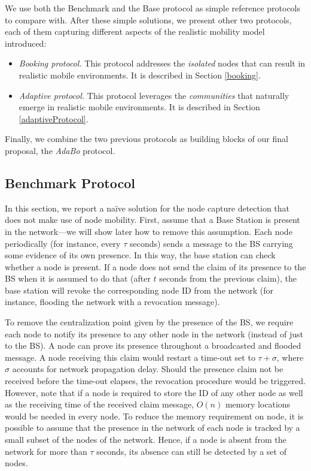 \documentclass{IEEEconf}
\begin{document}
We use both the Benchmark and the Base protocol as simple reference protocols to compare with.
After these simple solutions, we present other two protocols, each of them capturing different aspects of the realistic mobility model introduced:
\begin{itemize}
\item \textit{Booking protocol.} This protocol addresses the \textit{isolated} nodes that can result in
realistic mobile environments. It is described in Section \ref{booking}.
\item \textit{Adaptive protocol.} This protocol leverages the \textit{communities} that naturally emerge in realistic mobile environments. It is described in Section \ref{adaptiveProtocol}.
\end{itemize}

Finally, we combine the two previous protocols as building blocks of our final proposal, the {\em AdaBo} protocol.



\subsection{Benchmark Protocol}
\label{benchmark}

In this section, we report a na\"{i}ve solution for the node capture detection that does not make
use of node mobility. First, assume that a Base Station is present in the network---we will show later how to remove this assumption. Each node periodically (for instance, every $\tau$ seconds) sends a message to the BS carrying  some evidence of its own presence. In this way, the base station can check whether a node is present.
If a node does not send the claim of its presence to the BS when it is assumed to do that (after $t$ seconds from the previous claim), the base station will revoke the corresponding node ID from the network  (for instance, flooding the network with a revocation message).

To remove the centralization point given by the presence of the BS, we require each node to notify its presence to any other node in the network (instead of just to the BS). A node can prove its presence throughout a broadcasted and flooded message.
A node receiving this claim would restart a time-out set to $\tau+\sigma$, where $\sigma$ accounts for network propagation delay. Should the presence claim not be received before the time-out elapses, the revocation procedure would be triggered. However, note that if a node is required to store the ID of any other node as well as the receiving time of the received claim message, $O(n)$ memory locations would be needed in every node.
To reduce the memory requirement on node, it is possible to assume that the presence in the network of each node is tracked by a small subset of the nodes of the network. Hence, if a node is absent from the network for more than $\tau$ seconds, its absence can still be detected by a set of nodes.
\end{document}
